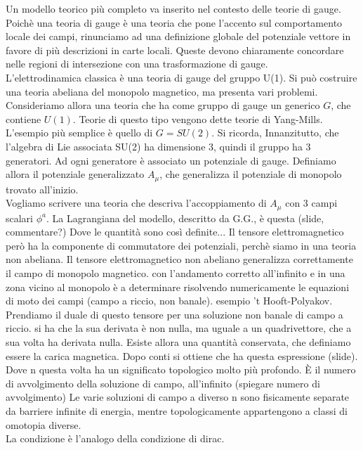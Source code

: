 \documentclass{report}
\begin{document}
Un modello teorico più completo va inserito nel contesto delle teorie di gauge.
Poichè una teoria di gauge è una teoria che pone l'accento sul comportamento locale
dei campi, rinunciamo ad una definizione globale del potenziale vettore
in favore di più descrizioni in carte locali. Queste devono chiaramente
concordare nelle regioni di intersezione con una trasformazione di gauge.\\

L'elettrodinamica classica è una teoria di gauge del gruppo U(1). Si può costruire
una teoria abeliana del monopolo magnetico, ma presenta vari problemi. Consideriamo
allora una teoria che ha come gruppo di gauge un generico $G$, che contiene $U(1)$.
Teorie di questo tipo vengono dette teorie di Yang-Mills. L'esempio più semplice
è quello di $G=SU(2)$. Si ricorda, Innanzitutto, che l'algebra di Lie associata SU(2)
ha dimensione 3, quindi il gruppo ha 3 generatori. Ad ogni generatore è associato un
potenziale di gauge. Definiamo allora il potenziale generalizzato $A_\mu$, che generalizza
il potenziale di monopolo trovato all'inizio.\\

Vogliamo scrivere una teoria che descriva l'accoppiamento di $A_\mu$ con 3 campi scalari
$\phi^a$. La Lagrangiana del modello, descritto da G.G., è questa (slide, commentare?)
Dove le quantità sono così definite... Il tensore elettromagnetico però ha la componente
di commutatore dei potenziali, perchè siamo in una teoria non abeliana. Il tensore elettromagnetico
non abeliano generalizza correttamente il campo di monopolo magnetico. con l'andamento
corretto all'infinito e in una zona vicino al monopolo è a determinare risolvendo
numericamente le equazioni di moto dei campi (campo a riccio, non banale). esempio
't Hooft-Polyakov.\\

Prendiamo il duale di questo tensore per una soluzione non banale di campo a riccio.
si ha che la sua derivata è non nulla, ma uguale a un quadrivettore, che a sua volta
ha derivata nulla. Esiste allora una quantità conservata, che definiamo essere
la carica magnetica. Dopo conti si ottiene che ha questa espressione (slide).
Dove n questa volta ha un significato topologico molto più profondo. È il numero
di avvolgimento della soluzione di campo, all'infinito (spiegare numero di avvolgimento)
Le varie soluzioni di campo a diverso n sono fisicamente separate da barriere
infinite di energia, mentre topologicamente appartengono a classi di omotopia diverse.\\
La condizione è l'analogo della condizione di dirac.\\
\end{document}
